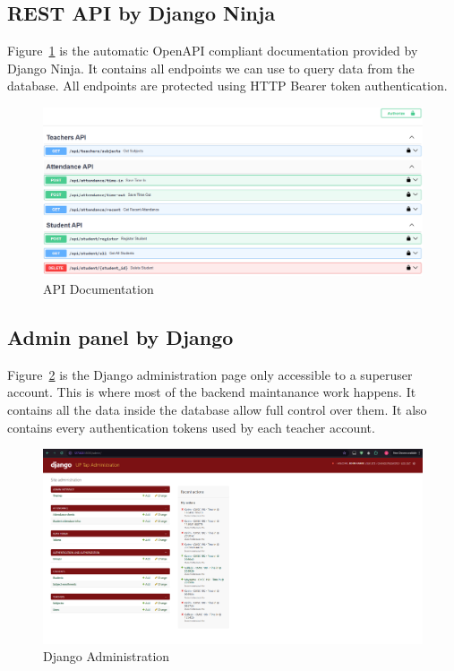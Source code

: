 \subsection{REST API by Django Ninja}
Figure~\ref{fig:api} is the automatic OpenAPI compliant documentation provided by Django Ninja. It contains all endpoints we can use to query data from the database. All endpoints are protected using HTTP Bearer token authentication.
\begin{figure}[h] %
	\centering
	\includegraphics[width=1\textwidth]{figures/chapter4/api.png} %
	\caption{API Documentation}
	\label{fig:api}
\end{figure}

\subsection{Admin panel by Django}
Figure~\ref{fig:admin} is the Django administration page only accessible to a superuser account. This is where most of the backend maintanance work happens. It contains all the data inside the database allow full control over them. It also contains every authentication tokens used by each teacher account.
\begin{figure}[h] %
	\centering
	\includegraphics[width=1\textwidth]{figures/chapter4/admin.png} %
	\caption{Django Administration}
	\label{fig:admin}
\end{figure}

